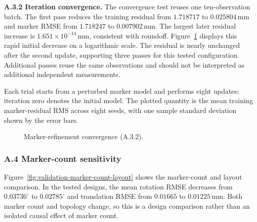 \documentclass[11pt]{article}
\begin{document}
\noindent\textbf{A.3.2 Iteration convergence.}
The convergence test reuses one ten-observation batch.  The first pass reduces
the training residual from $1.718717$ to $0.025804\,\mathrm{mm}$ and marker
RMSE from $1.718247$ to $0.007902\,\mathrm{mm}$.  The largest later residual
increase is $1.651\times10^{-14}\,\mathrm{mm}$, consistent with roundoff.
Figure~\ref{fig:validation-refinement-convergence} displays this rapid initial
decrease on a logarithmic scale.  The residual is nearly unchanged after the
second update, supporting three passes for this tested configuration.
Additional passes reuse the same observations and should not be interpreted as
additional independent measurements.

Each trial starts from a perturbed marker model and performs eight updates;
iteration zero denotes the initial model.  The plotted quantity is the mean
training marker-residual RMS across eight seeds, with one sample standard
deviation shown by the error bars.

\begin{figure}[H]
\centering
{}
\caption{Marker-refinement convergence (A.3.2).}
\label{fig:validation-refinement-convergence}
\end{figure}

\subsubsection*{A.4 Marker-count sensitivity}
Figure~\ref{fig:validation-marker-count-layout} shows the marker-count and
layout comparison.  In the tested designs, the mean rotation RMSE decreases
from $0.03736^\circ$ to $0.02785^\circ$ and translation RMSE from $0.01665$
to $0.01225\,\mathrm{mm}$.  Both marker count and topology change, so this is
a design comparison rather than an isolated causal effect of marker count.
\end{document}
